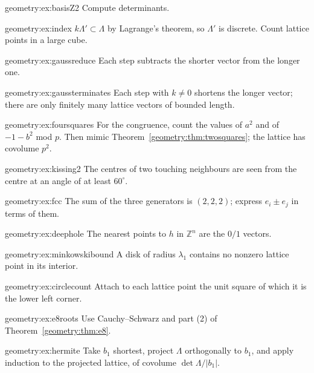 \begin{hint}{geometry:ex:basisZ2}
Compute determinants.
\end{hint}
\begin{hint}{geometry:ex:index}
$k\Lambda'\subset\Lambda$ by Lagrange's theorem, so $\Lambda'$ is discrete. Count lattice points in a large cube.
\end{hint}
\begin{hint}{geometry:ex:gaussreduce}
Each step subtracts the shorter vector from the longer one.
\end{hint}
\begin{hint}{geometry:ex:gaussterminates}
Each step with $k\ne0$ shortens the longer vector; there are only finitely many lattice vectors of bounded length.
\end{hint}
\begin{hint}{geometry:ex:foursquares}
For the congruence, count the values of $a^2$ and of $-1-b^2$ mod $p$. Then mimic Theorem~\ref{geometry:thm:twosquares}; the lattice has covolume $p^2$.
\end{hint}
\begin{hint}{geometry:ex:kissing2}
The centres of two touching neighbours are seen from the centre at an angle of at least $60^\circ$.
\end{hint}
\begin{hint}{geometry:ex:fcc}
The sum of the three generators is $(2,2,2)$; express $e_i\pm e_j$ in terms of them.
\end{hint}
\begin{hint}{geometry:ex:deephole}
The nearest points to $h$ in $\mathbb Z^n$ are the $0/1$ vectors.
\end{hint}
\begin{hint}{geometry:ex:minkowskibound}
A disk of radius $\lambda_1$ contains no nonzero lattice point in its interior.
\end{hint}
\begin{hint}{geometry:ex:circlecount}
Attach to each lattice point the unit square of which it is the lower left corner.
\end{hint}
\begin{hint}{geometry:ex:e8roots}
Use Cauchy--Schwarz and part (2) of Theorem~\ref{geometry:thm:e8}.
\end{hint}
\begin{hint}{geometry:ex:hermite}
Take $b_1$ shortest, project $\Lambda$ orthogonally to $b_1$, and apply induction to the projected lattice, of covolume $\det\Lambda/|b_1|$.
\end{hint}

